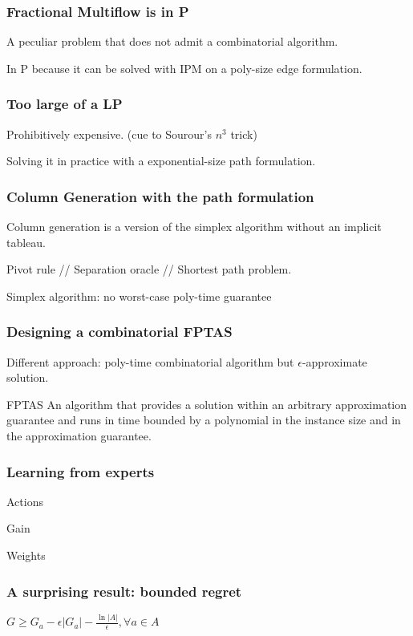 \documentclass{beamer}
\begin{document}
\begin{frame}
    \frametitle{Fractional Multiflow is in P}
    
    A peculiar problem that does not admit a combinatorial algorithm.

    In P because it can be solved with IPM on a poly-size edge formulation.

\end{frame}

\begin{frame}
    \frametitle{Too large of a LP}

    Prohibitively expensive. (cue to Sourour's $n^3$ trick)

    Solving it in practice with a exponential-size path formulation.
\end{frame}

\begin{frame}
    \frametitle{Column Generation with the path formulation}
    
    Column generation is a version of the simplex algorithm without an implicit 
    tableau.
    
    Pivot rule // Separation oracle // Shortest path problem.

    Simplex algorithm: no worst-case poly-time guarantee

\end{frame}

\begin{frame}
    \frametitle{Designing a combinatorial FPTAS}

    Different approach: poly-time combinatorial algorithm but
    $\epsilon$-approximate solution.

    FPTAS An algorithm that provides a solution within an arbitrary
    approximation guarantee and runs in time bounded by a polynomial in the
    instance size and in the approximation guarantee.

\end{frame}

\begin{frame}
    \frametitle{Learning from experts}

    Actions

    Gain

    Weights

\end{frame}

\begin{frame}
    \frametitle{A surprising result: bounded regret}

    $G \geq G_a - \epsilon |G_a| - \frac{\ln |A|}{\epsilon}, \forall a \in A$
\end{frame}
\end{document}
